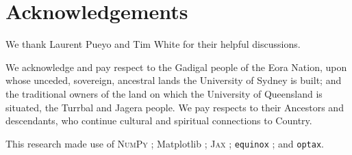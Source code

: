 \documentclass[]{spieman}
\newcommand\optax{\texttt{optax}\xspace}
\begin{document}
\section{Acknowledgements}

We thank Laurent Pueyo and Tim White for their helpful discussions.

We acknowledge and pay respect to the Gadigal people of the Eora Nation, upon whose unceded, sovereign, ancestral lands the University of Sydney is built; and the traditional owners of the land on which the University of Queensland is situated, the Turrbal and Jagera people. We pay respects to their Ancestors and descendants, who continue cultural and spiritual connections to Country. 

This research made use of \textsc{NumPy} \cite{numpy}; Matplotlib \cite{matplotlib}; \textsc{Jax} \cite{jax}; \texttt{equinox} \cite{kidger2021equinox}; and \optax \cite{optax2020github}.


\end{document}
